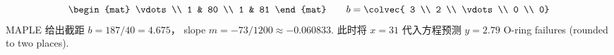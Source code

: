 \begin{exercises}
\begin{answer}
\begin{exparts}
\begin{equation*}
\begin{mat}
               \vdots \\
               1 & 80 \\
               1 & 81
            \end{mat}
            \qquad
            b = 
            \colvec{ 3 \\
                     2 \\
                     \vdots \\
                     0 \\
                     0}
          \end{equation*}
          MAPLE 给出截距 $b=187/40=4.675$，
          slope $m=-73/1200\approx -0.060833$.
          此时将 $x=31$ 代入方程预测
          $y=2.79$ O-ring failures (rounded to two places).

\end{exparts}
\end{answer}
\end{exercises}
